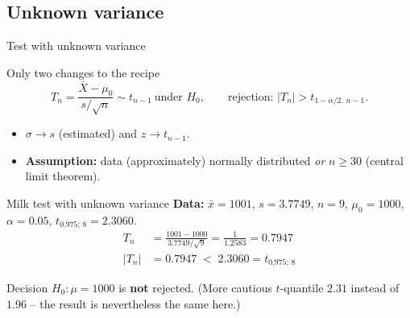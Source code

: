 \documentclass[aspectratio=169,11pt]{beamer}
\begin{document}
\subsection{Unknown variance}

\begin{frame}{Test with unknown variance}
  \begin{block}{Only two changes to the recipe}
    \[
      T_n = \frac{\bar{X}-\mu_0}{s/\sqrt{n}} \sim t_{n-1}\ \text{under } H_0,
      \qquad
      \text{rejection: } |T_n| > t_{1-\alpha/2,\,n-1}.
    \]
  \end{block}
  \begin{itemize}
    \item $\sigma \to s$ (estimated) and $z \to t_{n-1}$.
    \item \textbf{Assumption:} data (approximately) normally distributed
          \emph{or} $n \ge 30$ (central limit theorem).
  \end{itemize}
\end{frame}

\begin{frame}{Milk test with unknown variance}
  \textbf{Data:} $\bar{x}=1001$, $s=3.7749$, $n=9$, $\mu_0=1000$,
  $\alpha=0.05$, $t_{0.975;\,8}=2.3060$.
  \begin{align*}
    T_n &= \frac{1001-1000}{3.7749/\sqrt{9}} = \frac{1}{1.2583} = 0.7947\\[2pt]
    |T_n| &= 0.7947 \;<\; 2.3060 = t_{0.975;\,8}
  \end{align*}
  \begin{exampleblock}{Decision}
    $H_0:\mu=1000$ is \textbf{not} rejected. (More cautious $t$-quantile
    $2.31$ instead of $1.96$ -- the result is nevertheless the same here.)
  \end{exampleblock}
\end{frame}
\end{document}
